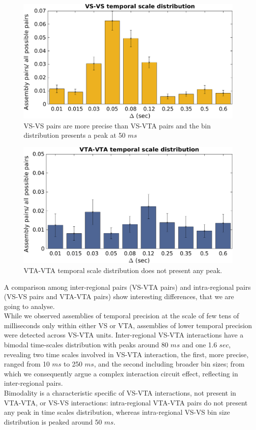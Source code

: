 \begin{figure}[H]
\includegraphics[scale=0.5]{figures/VS_VS_S.png}
\caption{VS-VS pairs are more precise than VS-VTA pairs and the bin distribution presents a peak at 50 $ms$}
\label{fig:BinDistrVS}
\end{figure}
\begin{figure}[H]
\includegraphics[scale=0.5]{figures/VTA_VTA_S.png}
\caption{VTA-VTA temporal scale distribution does not present any peak.}
\label{fig:BinDistrVTA}
\end{figure}
A comparison among inter-regional pairs (VS-VTA pairs) and intra-regional pairs (VS-VS pairs and VTA-VTA pairs) show interesting differences, that we are going to analyse.\\
While we observed assemblies of temporal precision at the scale of few tens of milliseconds only within either VS or VTA, assemblies of lower temporal precision were detected across VS-VTA units. Inter-regional VS-VTA interactions have a bimodal time-scales distribution with peaks around 80 $ms$ and one 1.6 $sec$, revealing two time scales involved in VS-VTA interaction, the first, more precise, ranged from 10 $ms$ to 250 $ms$, and the second including broader bin sizes; from which we consequently argue a complex interaction circuit effect, reflecting in inter-regional pairs.\\Bimodality is a characteristic specific of VS-VTA interactions, not present in VTA-VTA, or VS-VS interactions: intra-regional VTA-VTA pairs do not present any peak in time scales distribution, whereas intra-regional VS-VS bin size distribution is peaked around 50 $ms$.  
